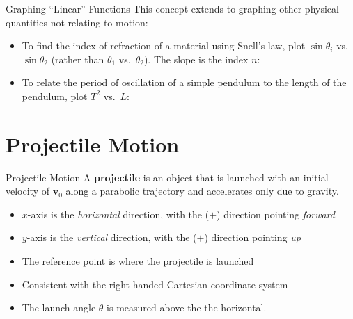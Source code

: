 \documentclass[12pt,compress,aspectratio=169]{beamer}
\newcommand{\eq}[2]{\vspace{#1}{\Large\begin{displaymath}#2\end{displaymath}}}
\begin{document}
\begin{frame}{Graphing ``Linear'' Functions}
  This concept extends to graphing other physical quantities not relating to
  motion:
  
  \vspace{.1in}
  \begin{itemize}
  \item To find the index of refraction of a material using Snell's law, plot
    $\sin\theta_i$ vs.\ $\sin\theta_2$ (rather than $\theta_1$ vs.\ $\theta_2$).
    The slope is the index $n$:

    \eq{-.25in}{
      \underbracket{\sin\theta_1}_y=\underbracket{n}_m
      \underbracket{\sin\theta_2}_x
    }
  \item To relate the period of oscillation of a simple pendulum to the length
    of the pendulum, plot $T^2$ vs.\ $L$:

    \eq{-.2in}{
      \underbracket{T^2}_y=\underbracket{\frac{4\pi^2}{g}}_m
      \underbracket{L}_x
    }
  \end{itemize}
\end{frame}


\section{Projectile Motion}

\begin{frame}{Projectile Motion}
  A \textbf{projectile} is an object that is launched with an initial velocity
  of $\bm{v}_0$ along a parabolic trajectory and accelerates only due to
  gravity.
  \begin{center}
  \end{center}
  \begin{itemize}
  \item $x$-axis is the \emph{horizontal} direction, with the ($+$) direction
    pointing \emph{forward}
  \item $y$-axis is the \emph{vertical} direction, with the ($+$) direction
    pointing \emph{up}
  \item The reference point is where the projectile is launched
  \item Consistent with the right-handed Cartesian coordinate system
  \item The launch angle $\theta$ is measured above the the horizontal.
  \end{itemize}
\end{frame}
\end{document}
